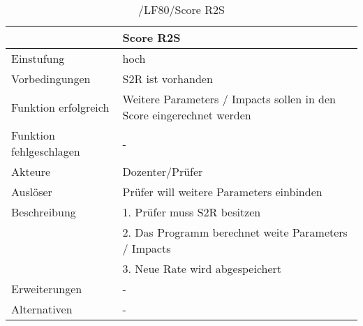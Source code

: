 	\begin{table}[H]
		\centering
		\caption{/LF80/Score R2S }
		\begin{tabularx}{\textwidth}{l|X}
			\toprule
			                        & Score R2S                                                            \\ \midrule
			Einstufung              & hoch                                                                 \\
			Vorbedingungen          & S2R ist vorhanden                                                    \\
			Funktion erfolgreich    & Weitere Parameters / Impacts sollen in den Score eingerechnet werden \\
			Funktion fehlgeschlagen & -                                                                    \\
			Akteure                 & Dozenter/Prüfer                                                      \\
			Auslöser                & Prüfer will weitere Parameters einbinden                             \\
			Beschreibung            & 1. Prüfer muss S2R besitzen                                          \\
			                        & 2. Das Programm berechnet weite Parameters / Impacts                 \\
			                        & 3. Neue Rate wird abgespeichert                                      \\
			Erweiterungen           & -                                                                    \\
			Alternativen            & -                                                                    \\ \bottomrule
		\end{tabularx}%
		\label{tab:LF80R2S}%
	\end{table}%
